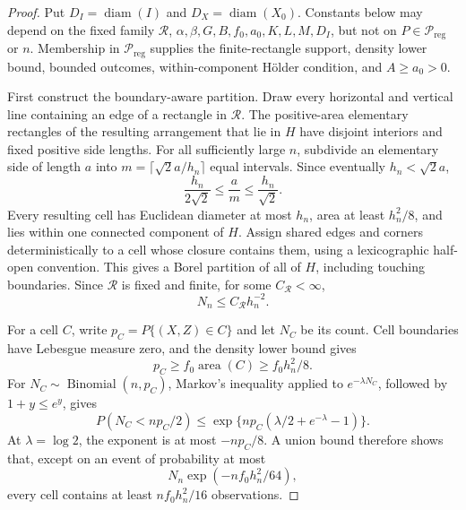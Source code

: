 \documentclass{article}
\begin{document}
\begin{proof}
Put \(D_I=\operatorname{diam}(I)\) and \(D_X=\operatorname{diam}(X_0)\).  Constants below may depend on the fixed family \(\mathscr R\), \(\alpha,\beta,G,B,f_0,a_0,K,L,M,D_I\), but not on \(P\in\mathcal P_{\mathrm{reg}}\) or \(n\).  Membership in \(\mathcal P_{\mathrm{reg}}\) supplies the finite-rectangle support, density lower bound, bounded outcomes, within-component H\"older condition, and \(A\geq a_0>0\).

First construct the boundary-aware partition.  Draw every horizontal and vertical line containing an edge of a rectangle in \(\mathscr R\).  The positive-area elementary rectangles of the resulting arrangement that lie in \(H\) have disjoint interiors and fixed positive side lengths.  For all sufficiently large \(n\), subdivide an elementary side of length \(a\) into \(m=\lceil\sqrt2a/h_n\rceil\) equal intervals.  Since eventually \(h_n<\sqrt2a\),
\[
 \frac{h_n}{2\sqrt2}\leq\frac{a}{m}\leq\frac{h_n}{\sqrt2}.
\]
Every resulting cell has Euclidean diameter at most \(h_n\), area at least \(h_n^2/8\), and lies within one connected component of \(H\).  Assign shared edges and corners deterministically to a cell whose closure contains them, using a lexicographic half-open convention.  This gives a Borel partition of all of \(H\), including touching boundaries.  Since \(\mathscr R\) is fixed and finite, for some \(C_{\mathscr R}<\infty\),
\[
 N_n\leq C_{\mathscr R}h_n^{-2}.
\]

For a cell \(C\), write \(p_C=P\{(X,Z)\in C\}\) and let \(N_C\) be its count.  Cell boundaries have Lebesgue measure zero, and the density lower bound gives
\[
 p_C\geq f_0\operatorname{area}(C)\geq f_0h_n^2/8.
\]
For \(N_C\sim\operatorname{Binomial}(n,p_C)\), Markov's inequality applied to \(e^{-\lambda N_C}\), followed by \(1+y\leq e^y\), gives
\[
 P(N_C<np_C/2)
 \leq\exp\{np_C(\lambda/2+e^{-\lambda}-1)\}.
\]
At \(\lambda=\log2\), the exponent is at most \(-np_C/8\).  A union bound therefore shows that, except on an event of probability at most
\[
 N_n\exp(-nf_0h_n^2/64),
\]
every cell contains at least \(nf_0h_n^2/16\) observations.


\end{proof}
\end{document}
